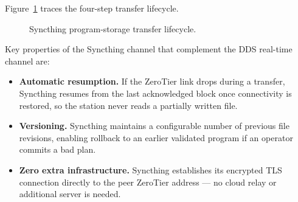 Figure~\ref{fig:ch6_syncthing_flow} traces the four-step transfer lifecycle.

\begin{figure}[H]
\centering
{}
\caption{Syncthing program-storage transfer lifecycle.}
\label{fig:ch6_syncthing_flow}
\end{figure}

Key properties of the Syncthing channel that complement the DDS real-time channel are:

\begin{itemize}
    \item \textbf{Automatic resumption.}  If the ZeroTier link drops during a transfer, Syncthing
          resumes from the last acknowledged block once connectivity is restored, so the station
          never reads a partially written file.

    \item \textbf{Versioning.}  Syncthing maintains a configurable number of previous file revisions,
          enabling rollback to an earlier validated program if an operator commits a bad plan.

    \item \textbf{Zero extra infrastructure.}  Syncthing establishes its encrypted TLS connection
          directly to the peer ZeroTier address — no cloud relay or additional server is needed.
\end{itemize}

